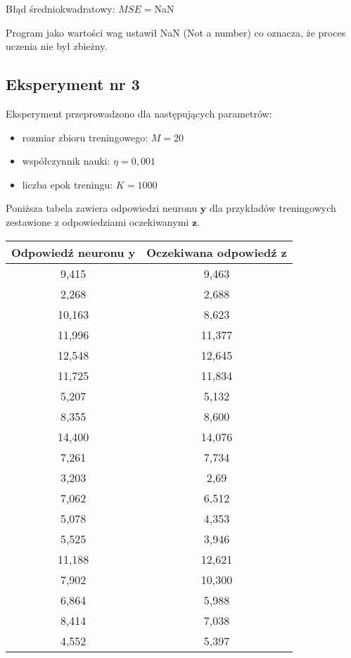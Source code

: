 \documentclass[12pt]{article}
\begin{document}
Błąd średniokwadratowy: $MSE = $NaN

Program jako wartości wag ustawił NaN (Not a number) co oznacza, że proces uczenia nie był zbieżny. 

\subsection{Eksperyment nr 3}

Eksperyment przeprowadzono dla następujących parametrów:

\begin{itemize}
\item rozmiar zbioru treningowego: $M = 20$ 
\item współczynnik nauki: $\eta = 0,001$
\item liczba epok treningu: $K = 1000$
\end{itemize}

Poniższa tabela zawiera odpowiedzi neuronu $\textbf{y}$ dla przykładów treningowych zestawione z odpowiedziami oczekiwanymi $\textbf{z}$.

\clearpage

\begin{table}
\begin{tabular}{|c|c|}
\hline 
Odpowiedź neuronu $\textbf{y}$ & Oczekiwana odpowiedź $\textbf{z}$ \\ 
\hline 
9,415 & 9,463 \\ \hline 
2,268 & 2,688 \\ \hline 
10,163 & 8,623 \\ \hline 
11,996 & 11,377 \\ \hline 
12,548 & 12,645 \\ \hline 
11,725 & 11,834 \\ \hline 
5,207 & 5,132 \\ \hline 
8,355 & 8,600 \\ \hline 
14,400 & 14,076 \\ \hline 
7,261 & 7,734 \\ \hline 
3,203 & 2,69 \\ \hline 
7,062 & 6,512 \\ \hline 
5,078 & 4,353 \\ \hline 
5,525 & 3,946 \\ \hline 
11,188 & 12,621 \\ \hline 
7,902 & 10,300 \\ \hline 
6,864 & 5,988 \\ \hline 
8,414 & 7,038 \\ \hline 
4,552 & 5,397 \\ \hline
\end{tabular} 
\end{table}
\end{document}
